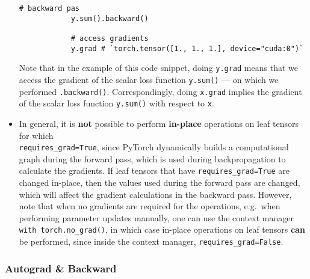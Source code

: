 \documentclass[12pt, a4paper]{scrbook}
\numberwithin{equation}{section}
\theoremstyle{definition}
\theoremstyle{definition}
\begin{document}
\begin{itemize}
\begin{lstlisting}[style=mystylepython, label=alg:retain_grad, xleftmargin=\parindent]
			# backward pas
			y.sum().backward()
			
			# access gradients
			y.grad # `torch.tensor([1., 1., 1.], device="cuda:0")`
		\end{lstlisting}
		
		Note that in the example of this code snippet, doing \texttt{y.grad} means that we access the gradient of the scalar loss function \texttt{y.sum()} --- on which we performed \texttt{.backward()}. Correspondingly, doing \texttt{x.grad} implies the gradient of the scalar loss function \texttt{y.sum()} with respect to \texttt{x}.
		
		\item In general, it is \textbf{not} possible to perform \textbf{in-place} operations on leaf tensors for which \\ \texttt{requires\_grad=True}, since
		PyTorch dynamically builds a computational graph during the forward pass, which is used during backpropagation to calculate the gradients. If leaf tensors that have \texttt{requires\_grad=True} are changed in-place, then the values used during the forward pass are changed, which will affect the gradient calculations in the backward pass. However, note that when no gradients are required for the operations, e.g.~when performing parameter updates manually, one can use the context manager \texttt{with torch.no\_grad()}, in which case in-place operations on leaf tensors \textbf{can} be performed, since inside the context manager, \texttt{requires\_grad=False}.
		
	\end{itemize}		
	
	\subsubsection{Autograd \& Backward}
	
\end{document}
